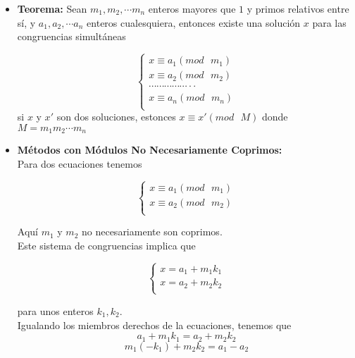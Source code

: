 \begin{itemize}
    \item{
		\textbf{Teorema:}
		Sean $m_1, m_2, \cdots m_n $  enteros mayores que $1$ y primos relativos entre s\'i, y 
		$a_1, a_2, \cdots a_n$ enteros cualesquiera, entonces existe una soluci\'on $x$ para 
		las congruencias simult\'aneas
		
		\begin{equation*}
			\left \{
				\begin{aligned}
					x \equiv a_1 (mod\text{ } m_1)\\
					x \equiv a_2 (mod\text{ } m_2)\\
					\cdots\cdots\cdots\cdots\cdots\cdot\cdot\\
					x \equiv a_n (mod\text{ } m_n)\\	
				\end{aligned}
			\right.
		\end{equation*}
	    si $x$ y $x'$ son dos soluciones, estonces $x\equiv x' (mod\text{ } M)$ donde $M = m_1 m_2 \cdots m_n$ 	
    }
    \item{
		\textbf{M\'etodos con M\'odulos No Necesariamente Coprimos:}\\
		Para dos ecuaciones tenemos
		
		\begin{equation*}
			\left \{
				\begin{aligned}
					x \equiv a_1 (mod\text{ } m_1)\\
					x \equiv a_2 (mod\text{ } m_2)\\
				\end{aligned}
			\right.
		\end{equation*}
		
		Aqu\'i $m_1$ y $m_2$ no necesariamente son coprimos.\\
		Este sistema de congruencias implica que
		
		\begin{equation*}
			\left \{
				\begin{aligned}
					x = a_1 + m_1 k_1\\
					x = a_2 + m_2 k_2\\
				\end{aligned}
			\right.
		\end{equation*}
		 
		para unos enteros $k_1, k_2$. \\
		Igualando los miembros derechos de la ecuaciones, tenemos que 
		$$ a_1 + m_1 k_1 = a_2 + m_2 k_2$$ 
		$$ m_1(-k_1) + m_2 k_2 = a_1 - a_2$$
		
}
\end{itemize}
